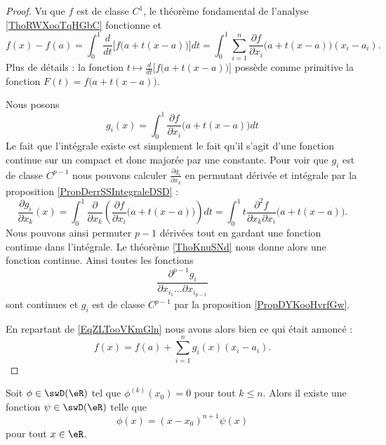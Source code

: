 \begin{proof}
    Vu que \( f\) est de classe \( C^1\), le théorème fondamental de l'analyse \ref{ThoRWXooTqHGbC} fonctionne et
    \begin{equation}    \label{EqZLTooVKmGln}
        f(x)-f(a)=\int_0^1\frac{ d }{ dt }\Big[ f\big( a+t(x-a) \big) \Big]dt=\int_0^1\sum_{i=1}^n\frac{ \partial f }{ \partial x_i }\big( a+t(x-a) \big)(x_i-a_i).
    \end{equation}
    Plus de détails : la fonction \( t\mapsto \frac{ d }{ dt }\Big[ f\big( a+t(x-a) \big) \Big]\) possède comme primitive la fonction \( F(t)=f\big( a+t(x-a) \big)\).

    Nous posons 
    \begin{equation}
        g_i(x)=\int_0^1\frac{ \partial f }{ \partial x_i }\big( a+t(x-a) \big)dt
    \end{equation}
    Le fait que l'intégrale existe est simplement le fait qu'il s'agit d'une fonction continue sur un compact et donc majorée par une constante. Pour voir que \( g_i\) est de classe \( C^{p-1}\) nous pouvons calculer \( \frac{ \partial g_i }{ \partial x_k }\) en permutant dérivée et intégrale par la proposition \ref{PropDerrSSIntegraleDSD} :
    \begin{equation}
        \frac{ \partial g_i }{ \partial x_k }(x)=\int_0^1\frac{ \partial  }{ \partial x_k }\left( \frac{ \partial f }{ \partial x_i }\big( a+t(x-a) \big) \right)dt=\int_0^1 t\frac{ \partial^2f }{ \partial x_k\partial x_i }\big( a+t(x-a) \big).
    \end{equation}
    Nous pouvons ainsi permuter \( p-1\) dérivées tout en gardant une fonction continue dans l'intégrale. Le théorème \ref{ThoKnuSNd} nous donne alors une fonction continue. Ainsi toutes les fonctions
    \begin{equation}
        \frac{ \partial^{p-1}g_i }{ \partial x_{i_1}\ldots\partial x_{i_{p-1}} }
    \end{equation}
    sont continues et \( g_i\) est de classe \( C^{p-1}\) par la proposition \ref{PropDYKooHvrfGw}.

    En repartant de \eqref{EqZLTooVKmGln} nous avons alors bien ce qui était annoncé :
    \begin{equation}
        f(x)=f(a)+\sum_{i=1}^ng_i(x)(x_i-a_i).
    \end{equation}
\end{proof}

\begin{corollary}       \label{CorQBXHooZVKeNG}
    Soit \( \phi\in\swD(\eR)\) tel que \( \phi^{(k)}(x_0)=0\) pour tout \( k\leq n\). Alors il existe une fonction \( \psi\in\swD(\eR)\) telle que 
    \begin{equation}
        \phi(x)=(x-x_0)^{n+1}\psi(x)
    \end{equation}
    pour tout \( x\in \eR\).
\end{corollary}

